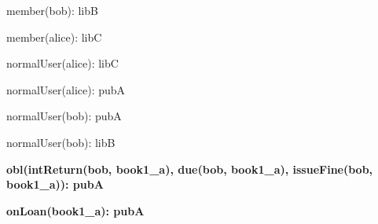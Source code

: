 \documentclass{article}
\begin{document}
{\begin{minipage}{\tableWidth}
\begin{description}[align=left,leftmargin=1em,noitemsep,labelsep=\parindent]
\item{{member(\allowbreak{}bob): libB}}
\item{{member(\allowbreak{}alice): libC}}
\item{{normalUser(\allowbreak{}alice): libC}}
\item{{normalUser(\allowbreak{}alice): pubA}}
\item{{normalUser(\allowbreak{}bob): pubA}}
\item{{normalUser(\allowbreak{}bob): libB}}
\item\textbf{{obl(\allowbreak{}intReturn(\allowbreak{}bob, book1\_a), due(\allowbreak{}bob, book1\_a), issueFine(\allowbreak{}bob, book1\_a)): pubA}}
\item\textbf{{onLoan(\allowbreak{}book1\_a): pubA}}
\end{description}\end{minipage}}
\end{document}
